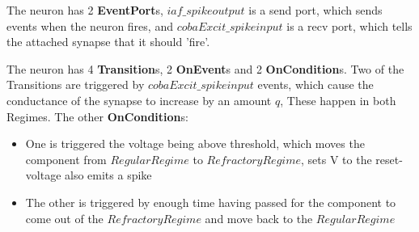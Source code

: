 \documentclass{article}
\newcommand{\EventPorts}{{\bf{EventPort}}s\xspace}
\newcommand{\Transitions}{{\bf{Transition}}s\xspace}
\newcommand{\OnEvents}{{\bf{OnEvent}}s\xspace}
\newcommand{\OnConditions}{{\bf{OnCondition}}s\xspace}
\begin{document}
The neuron has 2 \EventPorts, $iaf\_spikeoutput$ is a send port, which sends events when the neuron fires, and $cobaExcit\_spikeinput$ is a recv port, which tells the attached synapse that it should 'fire'.


The neuron has 4 \Transitions, 2 \OnEvents  and 2 \OnConditions.
Two of the Transitions are triggered by $cobaExcit\_spikeinput$ events, which cause the conductance of the synapse to increase by an amount $q$, These happen in both Regimes.
The other \OnConditions:
\begin{itemize}
\item One is triggered the voltage being above threshold, which moves the component from $RegularRegime$ to $RefractoryRegime$, sets V to the reset-voltage also emits a spike
\item The other is triggered by enough time having passed for the component to come out of the $RefractoryRegime$ and move back to the $RegularRegime$
\end{itemize}
\end{document}

